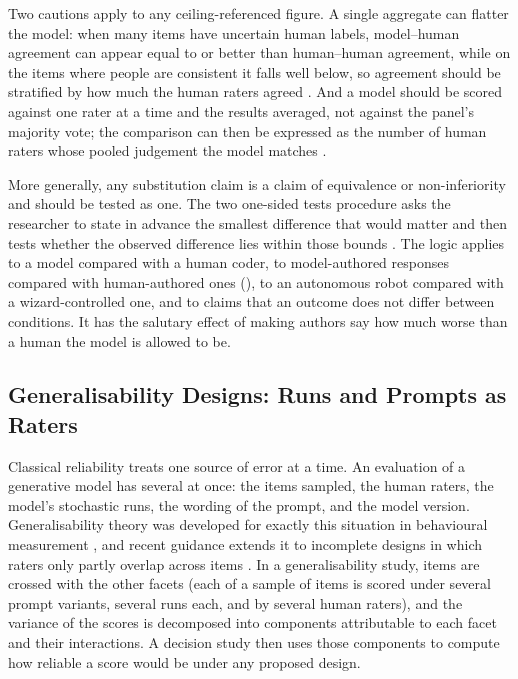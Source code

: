 Two cautions apply to any ceiling-referenced figure. A single aggregate can
flatter the model: when many items have uncertain human labels,
model--human agreement can appear equal to or better than human--human
agreement, while on the items where people are consistent it falls well
below, so agreement should be stratified by how much the human raters
agreed \cite{elangovan2025beyond}. And a model should be scored against one
rater at a time and the results averaged, not against the panel's majority
vote; the comparison can then be expressed as the number of human raters
whose pooled judgement the model matches \cite{resnick2021principled}.

More generally, any substitution claim is a claim of equivalence or
non-inferiority and should be tested as one. The two one-sided tests
procedure asks the researcher to state in advance the smallest difference
that would matter and then tests whether the observed difference lies within
those bounds \cite{lakens2017equivalence,lakens2018equivalence}. The logic
applies to a model compared with a human coder, to model-authored responses
compared with human-authored ones (), to an autonomous robot
compared with a wizard-controlled one, and to claims that an outcome does not
differ between conditions. It has the salutary effect of making authors say
how much worse than a human the model is allowed to be.

\subsection{Generalisability Designs: Runs and Prompts as Raters}
\label{sec:gtheory}

Classical reliability treats one source of error at a time. An evaluation of
a generative model has several at once: the items sampled, the human raters,
the model's stochastic runs, the wording of the prompt, and the model
version. Generalisability theory was developed for exactly this situation in
behavioural measurement
\cite{shavelson1991generalizability,brennan2001generalizability}, and
recent guidance extends it to incomplete designs in which raters only
partly overlap across items \cite{tenhove2024updated}. In a
generalisability study, items are crossed with the other facets (each of a
sample of items is scored under several prompt variants, several runs each,
and by several human raters), and the variance of the scores is decomposed
into components attributable to each facet and their interactions. A
decision study then uses those components to compute how reliable a score
would be under any proposed design.

